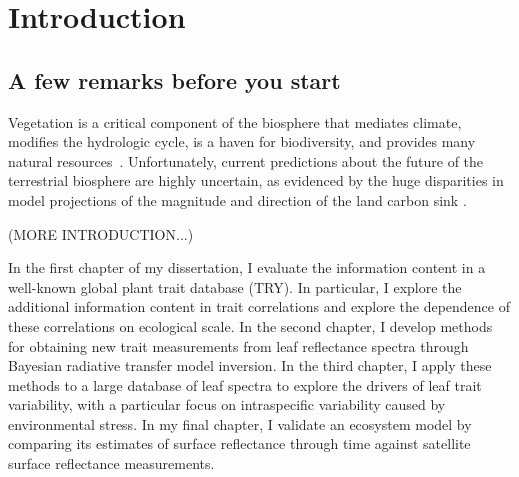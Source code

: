 \chapter{Introduction}
\label{chapter:Introduction}
\thispagestyle{myheadings}

\section{A few remarks before you start}
\label{sec:history}

Vegetation is a critical component of the biosphere that mediates climate, modifies the hydrologic cycle, is a haven for biodiversity, and provides many natural resources~\cite{bonan_forests_2008}.
Unfortunately, current predictions about the future of the terrestrial biosphere are highly uncertain, as evidenced by the huge disparities in model projections of the magnitude and direction of the land carbon sink \cite{friedlingstein_uncertainties_2014}.

(MORE INTRODUCTION...)

In the first chapter of my dissertation, I evaluate the information content in a well-known global plant trait database (TRY).
In particular, I explore the additional information content in trait correlations and explore the dependence of these correlations on ecological scale.
In the second chapter, I develop methods for obtaining new trait measurements from leaf reflectance spectra through Bayesian radiative transfer model inversion.
In the third chapter, I apply these methods to a large database of leaf spectra to explore the drivers of leaf trait variability, with a particular focus on intraspecific variability caused by environmental stress.
In my final chapter, I validate an ecosystem model by comparing its estimates of surface reflectance through time against satellite surface reflectance measurements.
